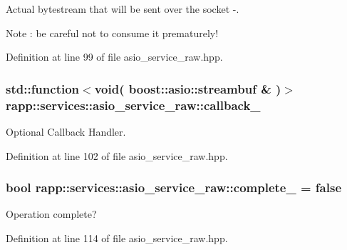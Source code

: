 Actual bytestream that will be sent over the socket -\/. 

\begin{DoxyNote}{Note}
\-: be careful not to consume it prematurely! 
\end{DoxyNote}


Definition at line 99 of file asio\-\_\-service\-\_\-raw.\-hpp.

\hypertarget{classrapp_1_1services_1_1asio__service__raw_a045f535c43a9fa18df911b7d73332358}{
\subsubsection[{callback\-\_\-}]{\setlength{\rightskip}{0pt plus 5cm}std\-::function$<$void( boost\-::asio\-::streambuf \& )$>$ rapp\-::services\-::asio\-\_\-service\-\_\-raw\-::callback\-\_\-\hspace{0.3cm}{\ttfamily [protected]}}}\label{classrapp_1_1services_1_1asio__service__raw_a045f535c43a9fa18df911b7d73332358}


Optional Callback Handler. 



Definition at line 102 of file asio\-\_\-service\-\_\-raw.\-hpp.

\hypertarget{classrapp_1_1services_1_1asio__service__raw_a24f0666266885acbe7a2fa260f7a5383}{
\subsubsection[{complete\-\_\-}]{\setlength{\rightskip}{0pt plus 5cm}bool rapp\-::services\-::asio\-\_\-service\-\_\-raw\-::complete\-\_\- = false\hspace{0.3cm}{\ttfamily [protected]}}}\label{classrapp_1_1services_1_1asio__service__raw_a24f0666266885acbe7a2fa260f7a5383}


Operation complete? 



Definition at line 114 of file asio\-\_\-service\-\_\-raw.\-hpp.

